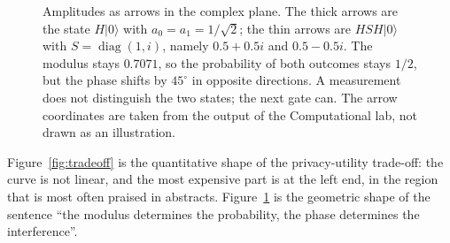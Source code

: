 \begin{figure}
\centering
{}
\caption{Amplitudes as arrows in the complex plane. The thick arrows are the state
$H|0\rangle$ with $a_0=a_1=1/\sqrt2$; the thin arrows are $HSH|0\rangle$ with
$S=\operatorname{diag}(1,i)$, namely $0.5+0.5i$ and $0.5-0.5i$. The modulus stays
$0.7071$, so the probability of both outcomes stays $1/2$, but the phase shifts by
$45^\circ$ in opposite directions. A measurement does not distinguish the two states; the
next gate can. The arrow coordinates are taken from the output of the Computational lab,
not drawn as an illustration.}
\label{fig:fase}
\end{figure}

Figure~\ref{fig:tradeoff} is the quantitative shape of the privacy-utility trade-off: the
curve is not linear, and the most expensive part is at the left end, in the region that is
most often praised in abstracts. Figure~\ref{fig:fase} is the geometric shape of the
sentence ``the modulus determines the probability, the phase determines the interference''.

